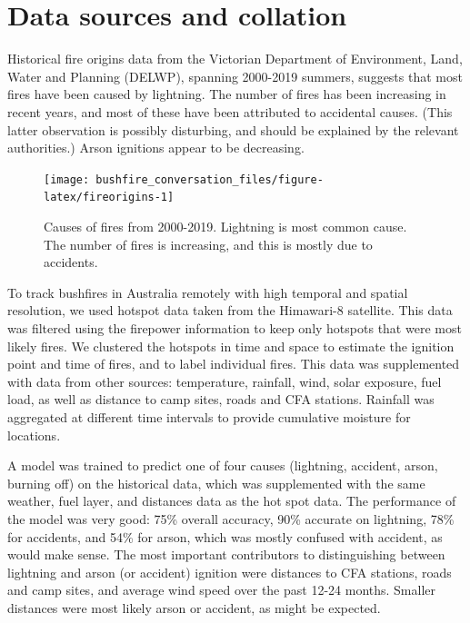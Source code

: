 \documentclass[
  11pt,
  a4paper,
]{article}
\begin{document}
\hypertarget{data}{%
\section{Data sources and collation}\label{data}}

Historical fire origins data from the Victorian Department of Environment, Land, Water and Planning (DELWP), spanning 2000-2019 summers, suggests that most fires have been caused by lightning. The number of fires has been increasing in recent years, and most of these have been attributed to accidental causes. (This latter observation is possibly disturbing, and should be explained by the relevant authorities.) Arson ignitions appear to be decreasing.

\begin{figure}[H]

{\centering \texttt{[image: bushfire\_conversation\_files/figure-latex/fireorigins-1]} 

}

\caption{Causes of fires from 2000-2019. Lightning is most common cause. The number of fires is increasing, and this is mostly due to accidents.}\label{fig:fireorigins}
\end{figure}

To track bushfires in Australia remotely with high temporal and spatial resolution, we used hotspot data taken from the Himawari-8 satellite. This data was filtered using the firepower information to keep only hotspots that were most likely fires. We clustered the hotspots in time and space to estimate the ignition point and time of fires, and to label individual fires. This data was supplemented with data from other sources: temperature, rainfall, wind, solar exposure, fuel load, as well as distance to camp sites, roads and CFA stations. Rainfall was aggregated at different time intervals to provide cumulative moisture for locations.

A model was trained to predict one of four causes (lightning, accident, arson, burning off) on the historical data, which was supplemented with the same weather, fuel layer, and distances data as the hot spot data. The performance of the model was very good: 75\% overall accuracy, 90\% accurate on lightning, 78\% for accidents, and 54\% for arson, which was mostly confused with accident, as would make sense. The most important contributors to distinguishing between lightning and arson (or accident) ignition were distances to CFA stations, roads and camp sites, and average wind speed over the past 12-24 months. Smaller distances were most likely arson or accident, as might be expected.
\end{document}
